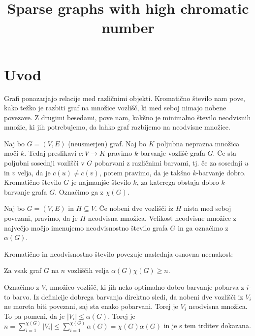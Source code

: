 \documentclass[mat1, tisk]{fmfdelo}
\title{Sparse graphs with high chromatic number}
\begin{document}
\section{Uvod}
Grafi ponazarjajo relacije med različnimi objekti. Kromatično število nam pove, kako težko je razbiti graf na množice vozlišč, ki med seboj nimajo nobene povezave.
Z drugimi besedami, pove nam, kakšno je minimalno število neodvisnih množic, ki jih potrebujemo, da lahko graf razbijemo na neodvisne množice.

    \begin{definicija}
        Naj bo $G = (V, E)$ (neusmerjen) graf. Naj bo $K$ poljubna neprazna množica moči $k$. Tedaj preslikavi $c: V \to K$ pravimo 
        $k$-barvanje vozlišč grafa $G$. Če sta poljubni sosednji vozlišči v $G$ pobarvani z različnimi barvami, tj. če za sosednji 
        $u$ in $v$ velja, da je $c(u) \neq c(v)$, potem pravimo, da je takšno $k$-barvanje dobro. Kromatično število $G$ je najmanjše
        število $k$, za katerega obstaja dobro $k$-barvanje grafa $G$. Označimo ga z $\chi(G)$.
    \end{definicija}

    \begin{definicija}
        Naj bo $G = (V, E)$ in $H \subseteq V$. Če nobeni dve vozlišči iz $H$ nista med seboj povezani, pravimo, da je $H$ neodvisna množica. Velikost neodvisne množice
        z največjo močjo imenujemo neodvisnostno število grafa $G$ in ga označimo z $\alpha(G)$.
    \end{definicija}

Kromatično in neodvisnostno število povezuje naslednja osnovna neenakost:
    
    \begin{trditev}
        Za vsak graf $G$ na $n$ vozliščih velja $\alpha(G)\chi(G) \geq n$.
        \label{spodnja_meja}
    \end{trditev}

    \begin{dokaz}
        Označimo z $V_i$ množico vozlišč, ki jih neko optimalno dobro barvanje pobarva z $i$-to barvo. Iz definicije dobrega barvanja direktno sledi, da nobeni dve vozlišči
        iz $V_i$ ne moreta biti povezani, saj sta enako pobarvani. Torej je $V_i$ neodvisna množica. To pa pomeni, da je $|V_i| \leq \alpha(G)$. Torej je 
        $n = \sum_{i=1}^{\chi(G)}|V_i| \leq \sum_{i=1}^{\chi(G)}\alpha(G) = \chi(G)\alpha(G)$ in je s tem trditev dokazana.
    \end{dokaz}
\end{document}
